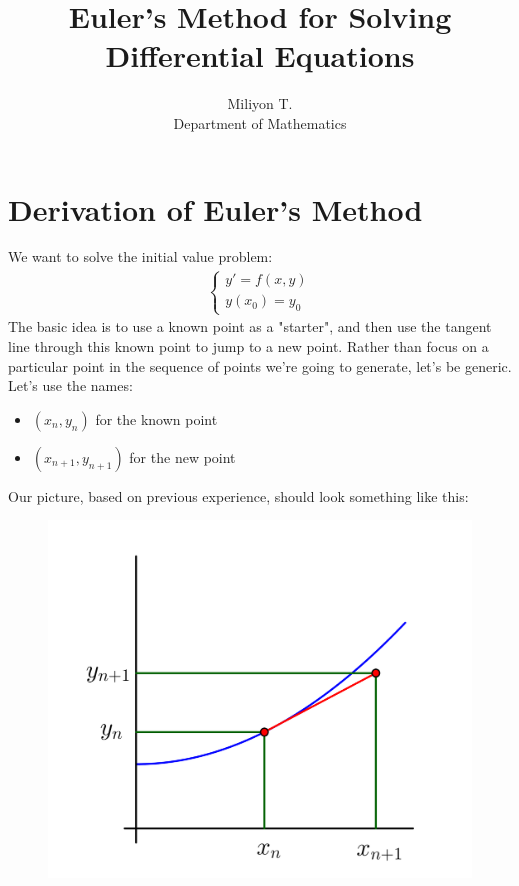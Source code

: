 \documentclass[leqno, 12pt]{article}
\begin{document}

\title{Euler's Method for Solving Differential Equations}%
\author{Miliyon T.\\ %
Department of Mathematics} %

\maketitle
\section*{Derivation of Euler's Method}

We want to solve the initial value problem:
\begin{align}
\begin{cases}
y' = f(x, y)\\
y(x_0) = y_0
\end{cases}
\end{align}
The basic idea is to use a known point as a "starter", and then use the tangent line through this known point to jump to a new point. Rather than focus on a particular point in the sequence of points we're going to generate, let's be generic. Let's use the names:
	\begin{itemize}
   \item $(x_n, y_n)$ for the known point
   \item $(x_{n+1}, y_{n+1})$ for the new point
 \end{itemize}
Our picture, based on previous experience, should look something like this:
\begin{figure}[hbt!]
\centering
\includegraphics[width=.55\textwidth]{Eulermethod1.png}
\end{figure}
\end{document}
